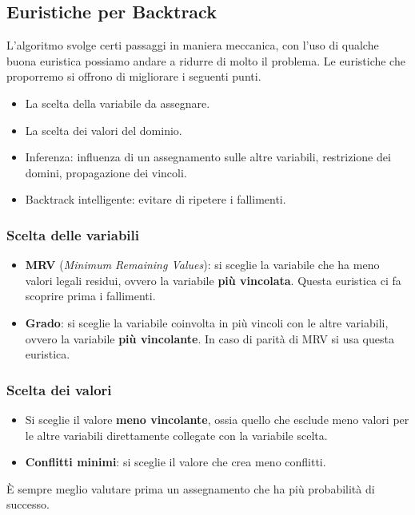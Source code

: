 \subsection{Euristiche per Backtrack}
L'algoritmo svolge certi passaggi in maniera meccanica, con l'uso di qualche buona euristica possiamo andare a ridurre di molto
il problema. Le euristiche che proporremo si offrono di migliorare i seguenti punti.
\begin{itemize}
	\item La scelta della variabile da assegnare.
	\item La scelta dei valori del dominio.
	\item Inferenza: influenza di un assegnamento sulle altre variabili, restrizione dei domini, propagazione dei vincoli.
	\item Backtrack intelligente: evitare di ripetere i fallimenti.
\end{itemize}

\subsubsection{Scelta delle variabili}
\begin{itemize}
	\item \textbf{MRV} (\emph{Minimum Remaining Values}): si sceglie la variabile che ha meno valori legali residui, ovvero la
	      variabile \textbf{pi\`u vincolata}. Questa euristica ci fa scoprire prima i fallimenti.
	\item \textbf{Grado}: si sceglie la variabile coinvolta in pi\`u vincoli con le altre variabili, ovvero la variabile
	      \textbf{pi\`u vincolante}. In caso di parit\`a di MRV si usa questa euristica.
\end{itemize}

\subsubsection{Scelta dei valori}
\begin{itemize}
	\item Si sceglie il valore \textbf{meno vincolante}, ossia quello che esclude meno valori per le altre variabili direttamente
	      collegate con la variabile scelta.
	\item \textbf{Conflitti minimi}: si sceglie il valore che crea meno conflitti.
\end{itemize}
\`E sempre meglio valutare prima un assegnamento che ha pi\`u probabilit\`a di successo.


